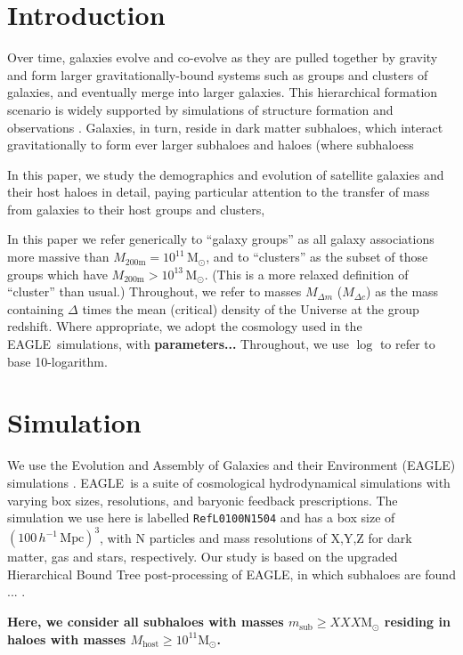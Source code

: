 \documentclass[usenatbib,fleqn]{mnras}
\newcommand{\comment}[1]{\textbf{\color{magenta} #1}}
\newcommand{\eagle}{EAGLE}
\newcommand{\hbt}{\textsc{hbt+}}
\newcommand{\msub}{m_\mathrm{sub}}
\newcommand{\Mhost}{M_\mathrm{host}}
\newcommand{\Msun}{\mathrm{M}_\odot}
\newcommand{\mtwo}{M_\mathrm{200m}}
\newcommand{\hMpc}{h^{-1}\,\mathrm{Mpc}}
\begin{document}
\section{Introduction}

Over time, galaxies evolve and co-evolve as they are pulled together by gravity and form larger gravitationally-bound systems such as groups and clusters of galaxies, and eventually merge into larger galaxies. This hierarchical formation scenario is widely supported by simulations of structure formation \citep[e.g.,][]{?} and observations \citep[e.g.,][]{?}. Galaxies, in turn, reside in dark matter subhaloes, which interact gravitationally to form ever larger subhaloes and haloes (where subhaloess

In this paper, we study the demographics and evolution of satellite galaxies and their host haloes in detail, paying particular attention to the transfer of mass from galaxies to their host groups and clusters, 

In this paper we refer generically to ``galaxy groups'' as all galaxy associations more massive than $\mtwo=10^{11}\,\Msun$, and to ``clusters'' as the subset of those groups which have $\mtwo>10^{13}\,\Msun$. (This is a more relaxed definition of ``cluster'' than usual.) Throughout, we refer to masses $M_{\Delta m}$ ($M_{\Delta c}$) as the mass containing $\Delta$ times the mean (critical) density of the Universe at the group redshift. Where appropriate, we adopt the cosmology used in the \eagle\ simulations,  with \textbf{parameters...}
%
Throughout, we use $\log$ to refer to base 10-logarithm.


\section{Simulation}

We use the Evolution and Assembly of Galaxies and their Environment (\eagle) simulations \citep{schaye15,crain15}. \eagle\ is a suite of cosmological hydrodynamical simulations with varying box sizes, resolutions, and baryonic feedback prescriptions. The simulation we use here is labelled \texttt{RefL0100N1504} and has a box size of $(100\,\hMpc)^3$, with N particles and mass resolutions of X,Y,Z for dark matter, gas and stars, respectively. Our study is based on the upgraded Hierarchical Bound Tree \citep[\hbt,][]{han18} post-processing of \eagle, in which subhaloes are found ... . 

\comment{Here, we consider all subhaloes with masses $\msub\geq XXX \Msun$ residing in haloes with masses $\Mhost\geq10^{11}\Msun$.}
\end{document}
